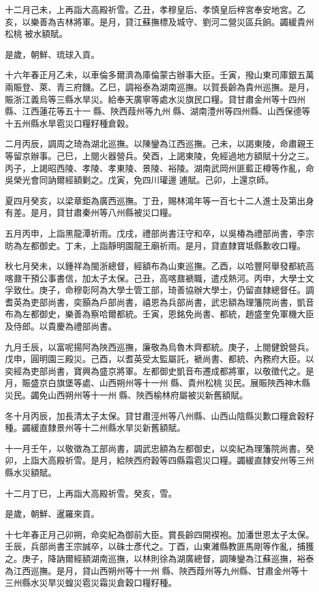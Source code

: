 \begin{pinyinscope}
十二月己未，上再詣大高殿祈雪。乙丑，孝穆皇后、孝慎皇后梓宮奉安地宮。乙亥，以樂善為吉林將軍。是月，貸江蘇撫標及城守、劉河二營災區兵餉。蠲緩貴州松桃被水額賦。

是歲，朝鮮、琉球入貢。

十六年春正月乙未，以車倫多爾濟為庫倫蒙古辦事大臣。壬寅，撥山東司庫銀五萬兩賑登、萊、青三府饑。乙巳，調裕泰為湖南巡撫。以賀長齡為貴州巡撫。是月，賑浙江義烏等三縣水旱災。給奉天廣寧等處水災旗民口糧。貸甘肅金州等十四州縣、江西蓮花等五十一縣、陜西葭州等九州縣、湖南澧州等四州縣、山西保德等十五州縣水旱雹災口糧籽種倉穀。

二月丙辰，調周之琦為湖北巡撫。以陳鑾為江西巡撫。己未，以謁東陵，命肅親王等留京辦事。己巳，上閱火器營兵。癸酉，上謁東陵，免經過地方額賦十分之三。丙子，上謁昭西陵、孝陵、孝東陵、景陵、裕陵。湖南武岡州匪藍正樽等作亂，命吳榮光會同訥爾經額剿之。戊寅，免四川瓘邊逋賦。己卯，上還京師。

夏四月癸亥，以梁章鉅為廣西巡撫。丁丑，賜林鴻年等一百七十二人進士及第出身有差。是月，貸甘肅秦州等八州縣被災口糧。

五月丙申，上詣黑龍潭祈雨。戊戌，禮部尚書汪守和卒，以吳椿為禮部尚書，李宗昉為左都御史。丁未，上詣靜明園龍王廟祈雨。是月，貸直隸寶坻縣歉收口糧。

秋七月癸未，以鍾祥為閩浙總督，經額布為山東巡撫。乙酉，以哈豐阿舉發都統高喀鼐干預公事書信，加太子太保。己丑，高喀鼐褫職，遣戍熱河。丙申，大學士文孚致仕。庚子，命穆彰阿為大學士管工部，琦善協辦大學士，仍留直隸總督任。調耆英為吏部尚書，奕顥為戶部尚書，禧恩為兵部尚書，武忠額為理籓院尚書，凱音布為左都御史，樂善為察哈爾都統。壬寅，恩銘免尚書、都統，趙盛奎免軍機大臣及侍郎。以貴慶為禮部尚書。

九月壬辰，以富呢揚阿為陜西巡撫，廉敬為烏魯木齊都統。庚子，上閱健銳營兵。戊申，圓明園三殿災。己酉，以耆英受太監屬託，褫尚書、都統、內務府大臣。以奕經為吏部尚書，寶興為盛京將軍。左都御史凱音布遷成都將軍，以敬徵代之。是月，賑盛京白旗堡等處、山西朔州等十一州縣、貴州松桃災民。展賑陜西神木縣災民。蠲免山西朔州等十一州縣、陜西榆林府屬被災新舊額賦。

冬十月丙辰，加長清太子太保。貸甘肅涇州等八州縣、山西山陰縣災歉口糧倉穀籽種。蠲緩直隸景州等十二州縣水旱災新舊額賦。

十一月壬午，以敬徵為工部尚書，調武忠額為左都御史，以奕紀為理籓院尚書。癸卯，上詣大高殿祈雪。是月，給陜西府穀等四縣霜雹災口糧。蠲緩直隸安州等三州縣水災額賦。

十二月丁巳，上再詣大高殿祈雪。癸亥，雪。

是歲，朝鮮、暹羅來貢。

十七年春正月己卯朔，命奕紀為御前大臣。賞長齡四開褉袍。加潘世恩太子太保。壬辰，兵部尚書王宗誠卒，以硃士彥代之。丁酉，山東濰縣教匪馬剛等作亂，捕獲之。庚子，降訥爾經額湖南巡撫，以林則徐為湖廣總督，調陳鑾為江蘇巡撫，裕泰為江西巡撫。是月，貸山西朔州等十一州縣、陜西葭州等九州縣、甘肅金州等十三州縣水災旱災蝗災雹災霜災倉穀口糧籽種。


\end{pinyinscope}
